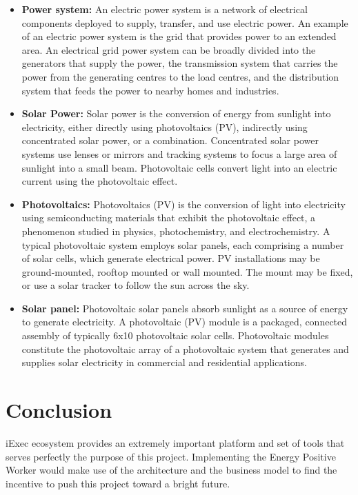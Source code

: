 \begin{itemize}
        \item \textbf{Power system:} An electric power system is a network of electrical components deployed to
        supply, transfer, and use electric power. An example of an electric power system is the grid that provides
        power to an extended area. An electrical grid power system can be broadly divided into the generators that
        supply the power, the transmission system that carries the power from the generating centres to the load
        centres, and the distribution system that feeds the power to nearby homes and
        industries\cite{power-system}.

        \item \textbf{Solar Power:} Solar power is the conversion of energy from sunlight into electricity, either
        directly using photovoltaics (PV), indirectly using concentrated solar power, or a combination.
        Concentrated solar power systems use lenses or mirrors and tracking systems to focus a large area of
        sunlight into a small beam. Photovoltaic cells convert light into an electric current using the
        photovoltaic effect\cite{solar-power}.

        \item \textbf{Photovoltaics:} Photovoltaics (PV) is the conversion of light into electricity using
        semiconducting materials that exhibit the photovoltaic effect, a phenomenon studied in physics,
        photochemistry, and electrochemistry. A typical photovoltaic system employs solar panels, each comprising
        a number of solar cells, which generate electrical power. PV installations may be ground-mounted, rooftop
        mounted or wall mounted. The mount may be fixed, or use a solar tracker to follow the sun across the
        sky\cite{photovoltaics}.

        \item \textbf{Solar panel:} Photovoltaic solar panels absorb sunlight as a source of energy to generate
        electricity. A photovoltaic (PV) module is a packaged, connected assembly of typically 6x10 photovoltaic
        solar cells. Photovoltaic modules constitute the photovoltaic array of a photovoltaic system that generates
        and supplies solar electricity in commercial and residential applications\cite{solar-panel}.
        
    \end{itemize}


\section{Conclusion}
    iExec ecosystem provides an extremely important platform and set of tools that serves perfectly the purpose of
    this project. Implementing the Energy Positive Worker would make use of the architecture and the business
    model to find the incentive to push this project toward a bright future.